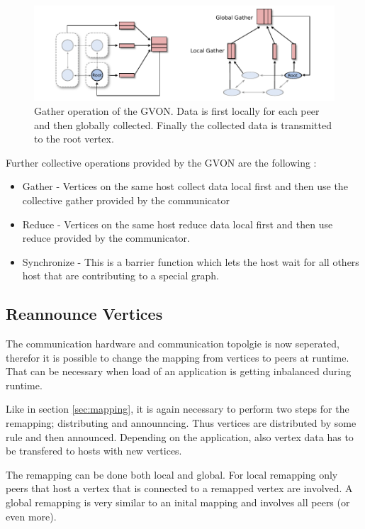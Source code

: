 \begin{figure}[H]
  \centering \includegraphics[width=\textwidth]{graphics/30_gon_collective}
  \caption{Gather operation of the GVON. Data is first locally for
    each peer and then globally collected. Finally the collected data
    is transmitted to the root vertex.}
  \label{fig:gon_collective}
\end{figure}

Further collective operations provided by the GVON are the 
following :

\begin{itemize}
\item Gather - Vertices on the same host collect data local first and
  then use the collective gather provided by the communicator
\item Reduce - Vertices on the same host reduce data local first and
  then use reduce provided by the communicator.
\item Synchronize - This is a barrier function which lets the host
  wait for all others host that are contributing to a special graph.
\end{itemize}

\subsection{Reannounce Vertices}
The communication hardware and communication topolgie is now
seperated, therefor it is possible to change the mapping from
vertices to peers at runtime. That can be necessary when load of an
application is getting inbalanced during runtime.

Like in section \ref{sec:mapping}, it is again necessary to perform two steps for the remapping;
distributing and announncing. Thus vertices are distributed by some
rule and then announced. Depending on the application, also 
vertex data has to be transfered to hosts with new vertices.

The remapping can be done both local and global. For local remapping
only peers that host a vertex that is connected to a remapped vertex
are involved. A global remapping is very similar to an inital mapping
and involves all peers (or even more).


